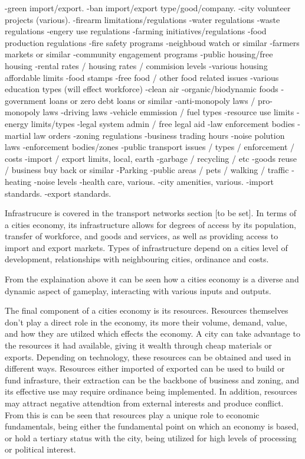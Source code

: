 -green import/export.
-ban import/export type/good/company.
-city volunteer projects (various).
-firearm limitations/regulations
-water regulations
-waste regulations
-engery use regulations
-farming initiatives/regulations
-food production regulations
-fire safety programs
-neighboud watch or similar
-farmers markets or similar
-community engagement programs
-public housing/free housing
-rental rates / housing rates / commision levels
-various housing affordable limits
-food stamps
-free food / other food related issues
-various education types (will effect workforce)
-clean air
-organic/biodynamic foods
-government loans or zero debt loans or similar
-anti-monopoly laws / pro-monopoly laws
-driving laws
-vehicle emmission / fuel types 
-resource use limits
-energy limits/types
-legal system admin / free legal aid
-law enforcement bodies
-martial law orders
-zoning regulations
-business trading hours
-noise polution laws
-enforcement bodies/zones
-public transport issues / types / enforcement / costs
-import / export limits, local, earth
-garbage / recycling / etc
-goods reuse / business buy back or similar
-Parking
-public areas / pets / walking / traffic
-heating
-noise levels
-health care, various.
-city amenities, various.
-import standards.
-export standards.



Infrastrucure is covered in the transport networks section [to be set]. In terms of a cities economy, its infrastructure allows for degrees of access by its population, transfer of workforce, and goods and services, as well as providing access to import and export markets. Types of infrastructure depend on a cities level of development, relationships with neighbouring cities, ordinance and costs. 


From the explaination above it can be seen how a cities economy is a diverse and dynamic aspect of gameplay, interacting with various inputs and outputs. 





The final component of a cities economy is its resources. Resources themselves don't play a direct role in the economy, its more their volume, demand, value, and how they are utilzed which effects the economy. A city can take advantage to the resources it had available, giving it wealth through cheap materials or exports. Depending on technology, these resources can be obtained and used in different ways. Resources either imported of exported can be used to build or fund infrasture, their extraction can be the backbone of business and zoning, and its effective use may require ordinance being implemented. In addition, resources may attract negative attendtion from external interests and produce conflict. From this is can be seen that resources play a unique role to economic fundamentals, being either the fundamental point on which an economy is based, or hold a tertiary status with the city, being utilized for high levels of processing or political interest.




